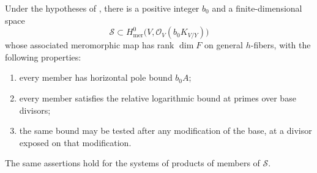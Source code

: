 \begin{lemma}\label{generaltype:relative-system}
Under the hypotheses of , there
is a positive integer \(b_0\) and a finite-dimensional space
\[
  \mathcal S\subset
  H^0_{\mathrm{mer}}\bigl(V,\mathcal O_V(b_0K_{V/Y})\bigr)
\]
whose associated meromorphic map has rank \(\dim F\) on general
\(h\)-fibers, with the following properties:
\begin{enumerate}[label=\textup{(\roman*)}]
\item every member has horizontal pole bound \(b_0A\);
\item every member satisfies the relative logarithmic bound
at primes over base divisors;
\item the same bound may be tested after any modification of
the base, at a divisor exposed on that modification.
\end{enumerate}
The same assertions hold for the systems of products of members
of \(\mathcal S\).
\end{lemma}

